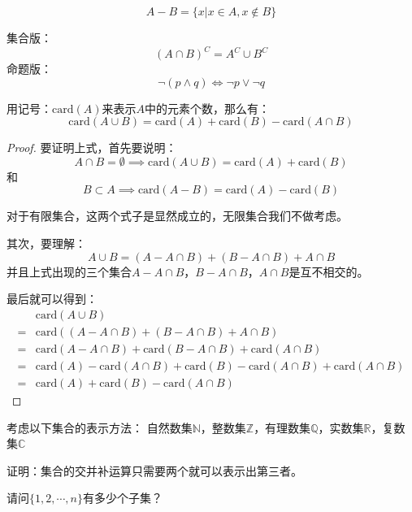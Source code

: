 \begin{definition}[差]
    $$A-B = \{x|x\in A, x\notin B\}$$
\end{definition}

\begin{theorem}[De Morgan定理]
    集合版：
    $$
        (A\cap B)^C = A^C\cup B^C
    $$
    命题版：
    $$
        \neg (p \land q) \iff \neg p \lor \neg q
    $$
\end{theorem}

\begin{exercise}[容斥原理]
    用记号：$\mathrm{card}(A)$来表示$A$中的元素个数，那么有：
    $$\mathrm{card}(A\cup B) = \mathrm{card}(A)+\mathrm{card}(B)-\mathrm{card}(A\cap B)$$
\end{exercise}

\begin{proof}
    要证明上式，首先要说明：
    $$A\cap B=\emptyset \implies \mathrm{card}(A\cup B) = \mathrm{card}(A)+\mathrm{card}(B)$$
    和
    $$B\subset A \implies \mathrm{card}(A-B) = \mathrm{card}(A)-\mathrm{card}(B)$$

    对于有限集合，这两个式子是显然成立的，无限集合我们不做考虑。

    其次，要理解：
    $$A\cup B = (A-A\cap B) + (B-A\cap B) + A\cap B$$
    并且上式出现的三个集合$A-A\cap B$，$B-A\cap B$，$A\cap B$是互不相交的。

    最后就可以得到：
    \begin{align*}
          & \mathrm{card}(A\cup B)                                                                                     \\
        = & \mathrm{card}((A-A\cap B) + (B-A\cap B) + A\cap B)                                                         \\
        = & \mathrm{card}(A-A\cap B) + \mathrm{card}(B-A\cap B) + \mathrm{card}(A\cap B)                               \\
        = & \mathrm{card}(A)-\mathrm{card}(A\cap B) + \mathrm{card}(B)-\mathrm{card}(A\cap B) + \mathrm{card}(A\cap B) \\
        = & \mathrm{card}(A)+\mathrm{card}(B)-\mathrm{card}(A\cap B)
    \end{align*}
\end{proof}

\begin{problemset}
    \item 考虑以下集合的表示方法：
    自然数集$\mathbb{N}$，整数集$\mathbb{Z}$，有理数集$\mathbb{Q}$，实数集$\mathbb{R}$，复数集$\mathbb{C}$
    \item 证明：集合的交并补运算只需要两个就可以表示出第三者。
    \item 请问$\{1,2,\cdots,n\}$有多少个子集？
\end{problemset}